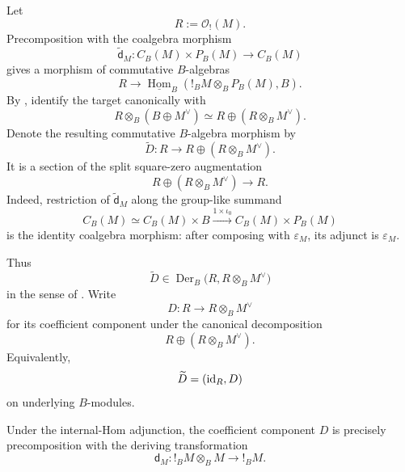 \begin{construction}
\label{con:spectral-convolution-derivation}
Let
\[
    R:=\mathcal O_!(M).
\]
Precomposition with the coalgebra morphism
\[
    \widetilde{\mathsf d}_M:
    C_B(M)\times P_B(M)\longrightarrow C_B(M)
\]
gives a morphism of commutative \(B\)-algebras
\[
    R
    \longrightarrow
    \underline{\operatorname{Hom}}_B
    (!_BM\otimes_BP_B(M),B).
\]
By , identify the target canonically with
\[
    R\otimes_B(B\oplus M^\vee)
    \simeq
    R\oplus(R\otimes_BM^\vee).
\]
Denote the resulting commutative \(B\)-algebra morphism by
\[
    \widetilde D:
    R
    \longrightarrow
    R\oplus(R\otimes_BM^\vee).
\]
It is a section of the split square-zero augmentation
\[
    R\oplus(R\otimes_BM^\vee)\longrightarrow R.
\]
Indeed, restriction of
\(\widetilde{\mathsf d}_M\) along the group-like summand
\[
    C_B(M)
    \simeq
    C_B(M)\times B
    \xrightarrow{1\times\iota_0}
    C_B(M)\times P_B(M)
\]
is the identity coalgebra morphism: after composing with
\(\varepsilon_M\), its adjunct is \(\varepsilon_M\).

Thus
\[
    \widetilde D
    \in
    \operatorname{Der}_B
    \bigl(R,R\otimes_BM^\vee\bigr)
\]
in the sense of . Write
\[
    D:
    R\longrightarrow R\otimes_BM^\vee
\]
for its coefficient component under the canonical decomposition
\[
    R\oplus(R\otimes_BM^\vee).
\]
Equivalently,
\[
    \widetilde D=(\operatorname{id}_R,D)
\]
on underlying \(B\)-modules.

Under the internal-Hom adjunction, the coefficient component \(D\) is
precisely precomposition with the deriving transformation
\[
    \mathsf d_M:
    !_BM\otimes_BM\longrightarrow !_BM.
\]
\end{construction}

